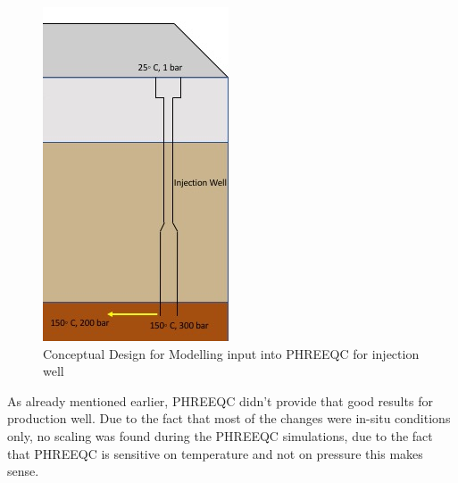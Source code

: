 \begin{figure}[h!]
    \centering
    \includegraphics[scale=0.5]{mini-con.jpeg}
    \caption{Conceptual Design for Modelling input into PHREEQC for injection well}
    \label{fig:modelling_re}
\end{figure}

\newline 
As already mentioned earlier, PHREEQC didn't provide that good results for production well.  Due to the fact that most of the changes were in-situ conditions only, no scaling was found during the PHREEQC simulations, due to the fact that PHREEQC is sensitive on temperature and not on pressure this makes sense. 






